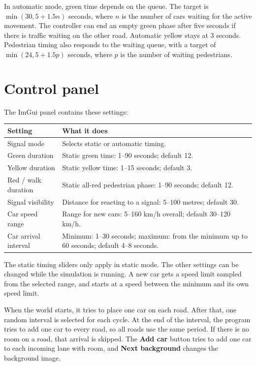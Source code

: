 \documentclass[12pt,a4paper]{article}
\begin{document}
	In automatic mode, green time depends on the queue. The target is
	\(\min(30, 5 + 1.5n)\) seconds, where \(n\) is the number of cars waiting for
	the active movement. The controller can end an empty green phase after five
	seconds if there is traffic waiting on the other road. Automatic yellow stays
	at 3 seconds. Pedestrian timing also responds to the waiting queue, with a
	target of \(\min(24, 5 + 1.5p)\) seconds, where \(p\) is the number of waiting
	pedestrians.
	
	\section{Control panel}
	
	The ImGui panel contains these settings:
	
	\begin{center}
		\begin{tabularx}{\linewidth}{@{}lX@{}}
			\toprule
			\textbf{Setting} & \textbf{What it does} \\
			\midrule
			Signal mode & Selects static or automatic timing. \\
			Green duration & Static green time: 1--90 seconds; default 12. \\
			Yellow duration & Static yellow time: 1--15 seconds; default 3. \\
			Red / walk duration & Static all-red pedestrian phase: 1--90 seconds; default
			12. \\
			Signal visibility & Distance for reacting to a signal: 5--100 metres; default
			30. \\
			Car speed range & Range for new cars: 5--160 km/h overall; default
			30--120 km/h. \\
			Car arrival interval & Minimum: 1--30 seconds; maximum: from the minimum up to
			60 seconds; default 4--8 seconds. \\
			\bottomrule
		\end{tabularx}
	\end{center}
	
	The static timing sliders only apply in static mode. The other settings can be
	changed while the simulation is running. A new car gets a speed limit sampled
	from the selected range, and starts at a speed between the minimum and its own
	speed limit.
	
	When the world starts, it tries to place one car on each road. After that, one
	random interval is selected for each cycle. At the end of the interval, the
	program tries to add one car to every road, so all roads use the same period.
	If there is no room on a road, that arrival is skipped. The \textbf{Add car}
	button tries to add one car to each incoming lane with room, and
	\textbf{Next background} changes the background image.
	
\end{document}
